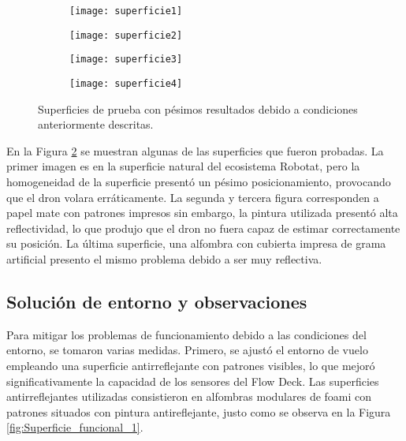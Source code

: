 \vspace{0.7cm}

\begin{figure}[htbp]
	\centering
	\begin{subfigure}[b]{0.26\textwidth}
		\centering
		\texttt{[image: superficie1]}
	\end{subfigure}
	\hspace{0.01\textwidth} %
	\begin{subfigure}[b]{0.26\textwidth}
		\centering
		\texttt{[image: superficie2]}
	\end{subfigure}
	\label{fig:Superficies_probadas1}
\end{figure}

\begin{figure}[htbp]
	\centering
	\begin{subfigure}[b]{0.26\textwidth}
		\centering
		\texttt{[image: superficie3]}
	\end{subfigure}
	\hspace{0.01\textwidth} %
	\begin{subfigure}[b]{0.27\textwidth}
		\centering
		\texttt{[image: superficie4]}
	\end{subfigure}
	\caption{Superficies de prueba con pésimos resultados debido a condiciones anteriormente descritas.}
	\label{fig:Superficies_probadas2}
\end{figure}

En la Figura \ref{fig:Superficies_probadas2} se muestran algunas de las superficies que fueron probadas. La primer imagen es en la superficie natural del ecosistema Robotat, pero la homogeneidad de la superficie presentó un pésimo posicionamiento, provocando que el dron volara erráticamente. La segunda y tercera figura corresponden a papel mate con patrones impresos sin embargo, la pintura utilizada presentó alta reflectividad, lo que produjo que el dron no fuera capaz de estimar correctamente su posición. La última superficie, una alfombra con cubierta impresa de grama artificial presento el mismo problema debido a ser muy reflectiva.

\subsection{Solución de entorno y observaciones}
Para mitigar los problemas de funcionamiento debido a las condiciones del entorno, se tomaron varias medidas. Primero, se ajustó el entorno de vuelo empleando una superficie antirreflejante con patrones visibles, lo que mejoró significativamente la capacidad de los sensores del Flow Deck. Las superficies antirreflejantes utilizadas consistieron en alfombras modulares de foami con patrones situados con pintura antireflejante, justo como se observa en la Figura \ref{fig:Superficie_funcional_1}.  

